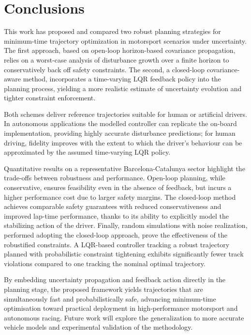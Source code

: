 \section{Conclusions}
\label{sec:conclusions}

This work has proposed and compared two robust planning strategies for minimum-time trajectory optimization in motorsport scenarios under uncertainty. The first approach, based on open-loop horizon-based covariance propagation, relies on a worst-case analysis of disturbance growth over a finite horizon to conservatively back off safety constraints. The second, a closed-loop covariance-aware method, incorporates a time-varying LQR feedback policy into the planning process, yielding a more realistic estimate of uncertainty evolution and tighter constraint enforcement.

Both schemes deliver reference trajectories suitable for human or artificial drivers. In autonomous applications the modelled controller can replicate the on-board implementation, providing highly accurate disturbance predictions; for human driving, fidelity improves with the extent to which the driver's behaviour can be approximated by the assumed time-varying LQR policy.

Quantitative results on a representative Barcelona-Catalunya sector highlight the trade-offs between robustness and performance. Open-loop planning, while conservative, ensures feasibility even in the absence of feedback, but incurs a higher performance cost due to larger safety margins. The closed-loop method achieves comparable safety guarantees with reduced conservativeness and improved lap-time performance, thanks to its ability to explicitly model the stabilizing action of the driver.
Finally, random simulations with noise realization, performed adopting the closed-loop approach, prove the effectiveness of the robustified constraints. A LQR-based controller tracking a robust trajectory planned with probabilistic constraint tightening exhibits significantly fewer track violations compared to one tracking the nominal optimal trajectory.

By embedding uncertainty propagation and feedback action directly in the planning stage, the proposed framework yields trajectories that are simultaneously fast and probabilistically safe, advancing minimum-time optimisation toward practical deployment in high-performance motorsport and autonomous racing. Future work will explore the generalization to more accurate vehicle models and experimental validation of the methodology. 